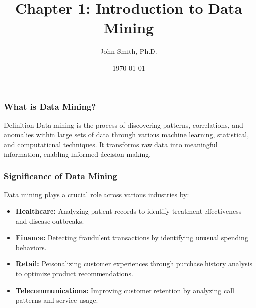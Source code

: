 \documentclass[aspectratio=169]{beamer}
\title[Introduction to Data Mining]{Chapter 1: Introduction to Data Mining}
\author[J. Smith]{John Smith, Ph.D.}
\date{\today}
\begin{document}
\frame{\titlepage}

\begin{frame}[fragile]
    \titlepage
\end{frame}

\begin{frame}[fragile]
    \frametitle{What is Data Mining?}
    \begin{block}{Definition}
        Data mining is the process of discovering patterns, correlations, and anomalies within large sets of data through various machine learning, statistical, and computational techniques. It transforms raw data into meaningful information, enabling informed decision-making.
    \end{block}
\end{frame}

\begin{frame}[fragile]
    \frametitle{Significance of Data Mining}
    Data mining plays a crucial role across various industries by:
    \begin{itemize}
        \item \textbf{Healthcare:} Analyzing patient records to identify treatment effectiveness and disease outbreaks.
        \item \textbf{Finance:} Detecting fraudulent transactions by identifying unusual spending behaviors.
        \item \textbf{Retail:} Personalizing customer experiences through purchase history analysis to optimize product recommendations.
        \item \textbf{Telecommunications:} Improving customer retention by analyzing call patterns and service usage.
    \end{itemize}
\end{frame}
\end{document}

